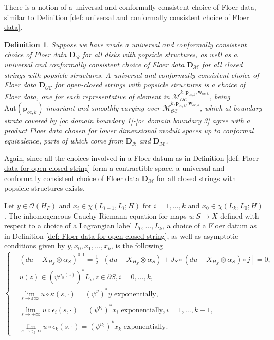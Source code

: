 \documentclass[11pt]{amsproc}
\def\o{\mathcal{O}}
\def\cR{\mathcal{R}}
\def\e{\epsilon}
\def\oc{\mathcal{OC}}
\def\e{\epsilon}
\def\r#1{\mathrm{#1}}
\def\k{\kappa}
\def\M{\mathcal{M}}
\def\p{\partial}
\def\sk{\mathfrak{s}}
\newtheorem{defn}[lem]{Definition}
\def\e{\epsilon}
\theoremstyle{remark}
\numberwithin{equation}{section}
\begin{document}
There is a notion of a universal and conformally consistent choice of Floer data, similar to Definition \ref{def: universal and conformally consistent choice of Floer data}.

\begin{defn}\label{def: universal and conformally consistent choice of Floer data for oc}
Suppose we have made a universal and conformally consistent choice of Floer data $\mathbf{D}_{\cR}$ for all disks with popsicle structures,
as well as a universal and conformally consistent choice of Floer data $\mathbf{D}_{\M}$ for all closed strings with popsicle structures.
A universal and conformally consistent choice of Floer data $\mathbf{D}_{\oc}$ for open-closed strings with popsicle structures is a choice of Floer data,
one for each representative of element in $\bar{\M}_{\oc}^{k, \mathbf{p}_{oc, k}, \mathbf{w}_{oc, k}}$, 
being $\r{Aut}(\mathbf{p}_{oc, k})$-invariant and smoothly varying over $\M_{\oc}^{k, \mathbf{p}_{oc, k}, \mathbf{w}_{oc, k}}$, 
which at boundary strata covered by \eqref{oc domain boundary 1}-\eqref{oc domain boundary 3} agree with a product Floer data chosen for lower dimensional moduli spaces up to conformal equivalence,
parts of which come from $\mathbf{D}_{\cR}$ and $\mathbf{D}_{\M}$.
\end{defn}

Again, since all the choices involved in a Floer datum as in Definition \ref{def: Floer data for open-closed string} form a contractible space, 
a universal and conformally consistent choice of Floer data $\mathbf{D}_{\M}$ for all closed strings with popsicle structures exists.

Let $y \in \o(H_{F})$ and $x_{i} \in \chi(L_{i-1}, L_{i}; H)$ for $i = 1, \ldots, k$ and $x_{0} \in \chi(L_{k}, L_{0}; H)$.
The inhomogeneous Cauchy-Riemann equation for maps $u: S \to X$ defined with respect to a choice of a Lagrangian label $L_{0}, \ldots, L_{k}$, 
a choice of a Floer datum as in Definition \ref{def: Floer data for open-closed string},
as well as asymptotic conditions given by $y, x_{0}, x_{1}, \ldots, x_{k}$,
is the following
\begin{equation}\label{cauchy-riemann for oc}
\begin{cases}
& (du-X_{H_{S}} \otimes \alpha_{S})^{0, 1} = \frac{1}{2} [ (du-X_{H_{S}} \otimes \alpha_{S}) + J_{S} \circ (du-X_{H_{S}} \otimes \alpha_{S}) \circ j] = 0, \\
& u(z) \in (\psi^{\rho_{S}(z)})^{*} L_{i}, z \in \p S, i = 0, \ldots, k, \\
& \lim\limits_{s \to \sk \infty} u \circ \k(s, \cdot) = (\psi^{\nu})^{*} y \text{ exponentially},  \\
& \lim\limits_{s \to +\infty} u \circ \e_{i}(s, \cdot) = (\psi^{\nu_{i}})^{*} x_{i} \text{ exponentially}, i=1,\ldots, k-1, \\
& \lim\limits_{s \to \sk_{k} \infty} u \circ \e_{k}(s, \cdot) = (\psi^{\nu_{0}})^{*} x_{k} \text{ exponentially}.
\end{cases}
\end{equation}
\end{document}
